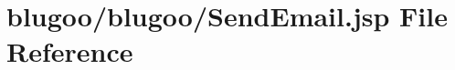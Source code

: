 \hypertarget{SendEmail_8jsp}{
\section{blugoo/blugoo/SendEmail.jsp File Reference}
\label{SendEmail_8jsp}
}


